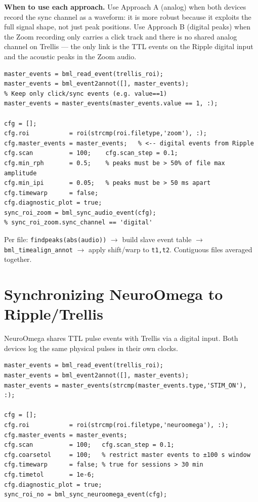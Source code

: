\documentclass[11pt, a4paper]{article}
\begin{document}
\begin{notebox}
  \textbf{When to use each approach.}
  Use Approach A (analog) when both devices record the sync channel as a waveform: it is more robust because it exploits the full signal shape, not just peak positions.
  Use Approach B (digital peaks) when the Zoom recording only carries a click track and there is no shared analog channel on Trellis --- the only link is the TTL events on the Ripple digital input and the acoustic peaks in the Zoom audio.
\end{notebox}

\begin{lstlisting}[style=matlab]
% master_events come from Ripple's DIGITAL event channel (TTL pulses)
master_events = bml_read_event(trellis_roi);
master_events = bml_event2annot([], master_events);
% Keep only click/sync events (e.g. value==1)
master_events = master_events(master_events.value == 1, :);

cfg = [];
cfg.roi           = roi(strcmp(roi.filetype,'zoom'), :);
cfg.master_events = master_events;   % <-- digital events from Ripple
cfg.scan          = 100;    cfg.scan_step = 0.1;
cfg.min_rph       = 0.5;    % peaks must be > 50% of file max amplitude
cfg.min_ipi       = 0.05;   % peaks must be > 50 ms apart
cfg.timewarp      = false;
cfg.diagnostic_plot = true;
sync_roi_zoom = bml_sync_audio_event(cfg);
% sync_roi_zoom.sync_channel == 'digital'
\end{lstlisting}

Per file: \texttt{findpeaks(abs(audio))} $\to$ build slave event table $\to$ \texttt{bml\_timealign\_annot} $\to$ apply shift/warp to \texttt{t1,t2}. Contiguous files averaged together.

\section{Synchronizing NeuroOmega to Ripple/Trellis}

NeuroOmega shares TTL pulse events with Trellis via a digital input. Both devices log the same physical pulses in their own clocks.

\begin{lstlisting}[style=matlab]
master_events = bml_read_event(trellis_roi);
master_events = bml_event2annot([], master_events);
master_events = master_events(strcmp(master_events.type,'STIM_ON'), :);

cfg = [];
cfg.roi           = roi(strcmp(roi.filetype,'neuroomega'), :);
cfg.master_events = master_events;
cfg.scan          = 100;   cfg.scan_step = 0.1;
cfg.coarsetol     = 100;   % restrict master events to ±100 s window
cfg.timewarp      = false; % true for sessions > 30 min
cfg.timetol       = 1e-6;
cfg.diagnostic_plot = true;
sync_roi_no = bml_sync_neuroomega_event(cfg);
\end{lstlisting}
\end{document}

